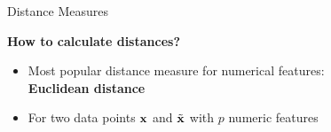 \documentclass[11pt,compress,t,notes=noshow, xcolor=table]{beamer}
\begin{document}
%
\begin{vbframe}{Distance Measures}







    \textbf{How to calculate distances?}
    \begin{itemize}
      \item Most popular distance measure for numerical features: \\
      \textbf{Euclidean distance}

      \item For two data points $\mathbf{x}$ and $\tilde{\mathbf{x}}$ with $p$ numeric features
  \end{itemize}





\end{vbframe}
\end{document}
